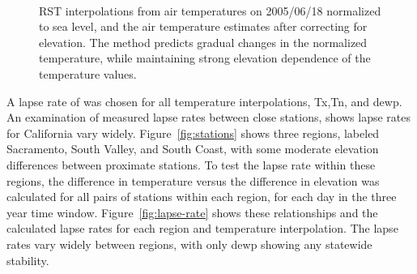 \documentclass[reviewcopy]{elsart}
\begin{document}
\begin{figure}[htbp]
  \centering
  \mbox{
     \quad
  }
  \caption{
%
    \acf{RST} interpolations from air temperatures on 2005/06/18
    normalized to sea level, and the air temperature estimates after correcting
    for elevation.  The method predicts gradual changes in the
    normalized temperature, while maintaining strong elevation
    dependence of the temperature values.
%
  }
  \label{fig:rst}
\end{figure}

A lapse rate of  was chosen for
all temperature interpolations, \ac{Tx},\ac{Tn}, and \ac{dewp}.  An
examination of measured lapse rates between close stations, shows
lapse rates for California vary widely.  Figure~\ref{fig:stations}
shows three regions, labeled Sacramento, South Valley, and South
Coast, with some moderate elevation differences between proximate
stations.  To test the lapse rate within these regions, the difference
in temperature versus the difference in elevation was calculated for
all pairs of stations within each region, for each day in the three
year time window.  Figure~\ref{fig:lapse-rate} shows these
relationships and the calculated lapse rates for each region and
temperature interpolation.  The lapse rates vary widely between
regions, with only \ac{dewp} showing any statewide stability.
\end{document}
